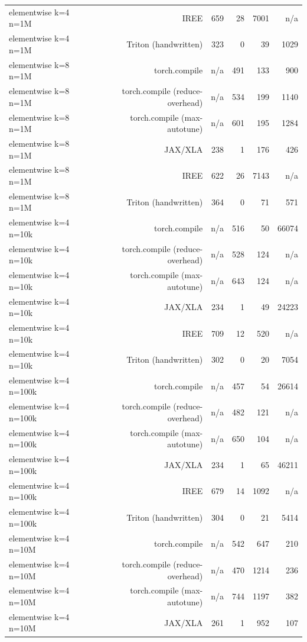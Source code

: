 \begin{tabular}{lrrrrr}
elementwise k=4 n=1M & IREE & 659 & 28 & 7001 & n/a \\
elementwise k=4 n=1M & Triton (handwritten) & 323 & 0 & 39 & 1029 \\
elementwise k=8 n=1M & torch.compile & n/a & 491 & 133 & 900 \\
elementwise k=8 n=1M & torch.compile (reduce-overhead) & n/a & 534 & 199 & 1140 \\
elementwise k=8 n=1M & torch.compile (max-autotune) & n/a & 601 & 195 & 1284 \\
elementwise k=8 n=1M & JAX/XLA & 238 & 1 & 176 & 426 \\
elementwise k=8 n=1M & IREE & 622 & 26 & 7143 & n/a \\
elementwise k=8 n=1M & Triton (handwritten) & 364 & 0 & 71 & 571 \\
elementwise k=4 n=10k & torch.compile & n/a & 516 & 50 & 66074 \\
elementwise k=4 n=10k & torch.compile (reduce-overhead) & n/a & 528 & 124 & n/a \\
elementwise k=4 n=10k & torch.compile (max-autotune) & n/a & 643 & 124 & n/a \\
elementwise k=4 n=10k & JAX/XLA & 234 & 1 & 49 & 24223 \\
elementwise k=4 n=10k & IREE & 709 & 12 & 520 & n/a \\
elementwise k=4 n=10k & Triton (handwritten) & 302 & 0 & 20 & 7054 \\
elementwise k=4 n=100k & torch.compile & n/a & 457 & 54 & 26614 \\
elementwise k=4 n=100k & torch.compile (reduce-overhead) & n/a & 482 & 121 & n/a \\
elementwise k=4 n=100k & torch.compile (max-autotune) & n/a & 650 & 104 & n/a \\
elementwise k=4 n=100k & JAX/XLA & 234 & 1 & 65 & 46211 \\
elementwise k=4 n=100k & IREE & 679 & 14 & 1092 & n/a \\
elementwise k=4 n=100k & Triton (handwritten) & 304 & 0 & 21 & 5414 \\
elementwise k=4 n=10M & torch.compile & n/a & 542 & 647 & 210 \\
elementwise k=4 n=10M & torch.compile (reduce-overhead) & n/a & 470 & 1214 & 236 \\
elementwise k=4 n=10M & torch.compile (max-autotune) & n/a & 744 & 1197 & 382 \\
elementwise k=4 n=10M & JAX/XLA & 261 & 1 & 952 & 107 \\

\end{tabular}
